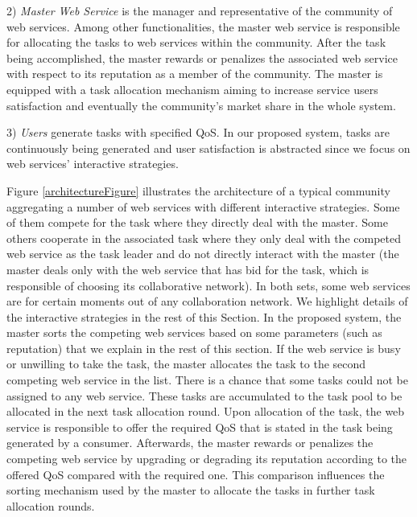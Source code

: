 \documentclass[fleqn]{singlecol-new}
\begin{document}
2) \textit{Master Web Service} is the manager and representative
of the community of web services. Among other functionalities, the
master web service is responsible for allocating the tasks to web
services within the community. After the task being accomplished,
the master rewards or penalizes the associated web service with
respect to its reputation as a member of the community. The master
is equipped with a task allocation mechanism aiming to increase
service users satisfaction and eventually the community's market
share in the whole system.

3) \textit{Users} generate tasks with specified QoS. In our
proposed system, tasks are continuously being generated and user
satisfaction is abstracted since we focus on web services'
interactive strategies.

Figure \ref{architectureFigure} illustrates the architecture of a
typical community aggregating a number of web services with
different interactive strategies. Some of them compete for the
task where they directly deal with the master. Some others
cooperate in the associated task where they only deal with the 
competed web service as the task leader and do not directly
interact with the master (the master deals only with the web
service that has bid for the task, which is responsible of
choosing its collaborative network). In both sets, some web
services are for certain moments out of any collaboration network.
We highlight details of the interactive strategies in the rest of
this Section.
In the proposed system, the master sorts the competing web
services based on some parameters (such as reputation) that we
explain in the rest of this section. If the web service is busy or
unwilling to take the task, the master allocates the task to the
second competing web service in the list. There is a chance that
some tasks could not be assigned to any web service. These tasks
are accumulated to the task pool to be allocated in the next task
allocation round. Upon allocation of the task, the web service is
responsible to offer the required QoS that is stated in the task
being generated by a consumer. Afterwards,  the master rewards or
penalizes the competing web service by upgrading or degrading its
reputation according to the offered QoS compared with the required
one. This comparison influences the sorting mechanism used by the
master to allocate the tasks in further task allocation rounds.
\end{document}
